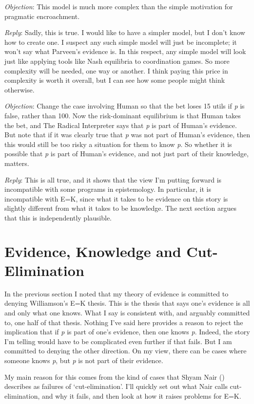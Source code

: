 \documentclass[
  10pt,
  letterpaper,
  twoside]{scrbook}
\begin{document}
\emph{Objection}: This model is much more complex than the simple
motivation for pragmatic encroachment.

\emph{Reply}: Sadly, this is true. I would like to have a simpler model,
but I don't know how to create one. I suspect any such simple model will
just be incomplete; it won't say what Parveen's evidence is. In this
respect, any simple model will look just like applying tools like Nash
equilibria to coordination games. So more complexity will be needed, one
way or another. I think paying this price in complexity is worth it
overall, but I can see how some people might think otherwise.

\emph{Objection}: Change the case involving Human so that the bet loses
15 utils if \emph{p} is false, rather than 100. Now the risk-dominant
equilibrium is that Human takes the bet, and The Radical Interpreter
says that \emph{p} is part of Human's evidence. But note that if it was
clearly true that \emph{p} was not part of Human's evidence, then this
would still be too risky a situation for them to know \emph{p}. So
whether it is possible that \emph{p} is part of Human's evidence, and
not just part of their knowledge, matters.

\emph{Reply}: This is all true, and it shows that the view I'm putting
forward is incompatible with some programs in epistemology. In
particular, it is incompatible with E=K, since what it takes to be
evidence on this story is slightly different from what it takes to be
knowledge. The next section argues that this is independently plausible.

\section{Evidence, Knowledge and Cut-Elimination}\label{sec-cutelim}

In the previous section I noted that my theory of evidence is committed
to denying Williamson's E=K thesis. This is the thesis that says one's
evidence is all and only what one knows. What I say is consistent with,
and arguably committed to, one half of that thesis. Nothing I've said
here provides a reason to reject the implication that if \emph{p} is
part of one's evidence, then one knows \emph{p}. Indeed, the story I'm
telling would have to be complicated even further if that fails. But I
am committed to denying the other direction. On my view, there can be
cases where someone knows \emph{p}, but \emph{p} is not part of their
evidence.

My main reason for this comes from the kind of cases that Shyam Nair
() describes as failures of
`cut-elimination'. I'll quickly set out what Nair calls cut-elimination,
and why it fails, and then look at how it raises problems for E=K.
\end{document}
